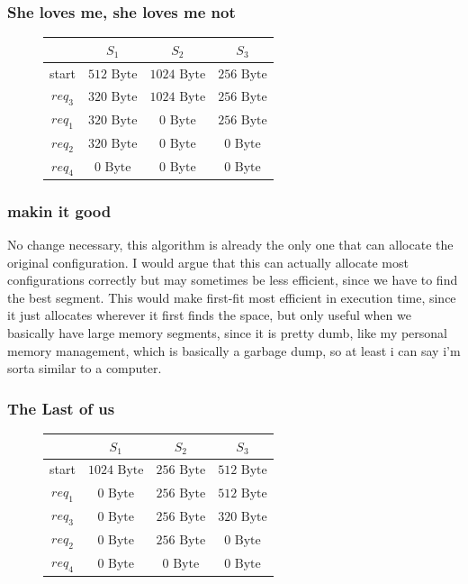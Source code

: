 \documentclass[a4paper, 11pt]{article}
\begin{document}
\subsubsection{She loves me, she loves me not}
\begin{figure}[h]
      \centering
      \begin{tabular}{|c|c|c|c|}
        \hline
        &$S_1$&$S_2$&$S_3$\\\hline
        start&$512 \mbox{ Byte}$&$1024 \mbox{ Byte}$&$256 \mbox{ Byte}$\\
        $req_3$&$320 \mbox{ Byte}$&$1024 \mbox{ Byte}$&$256 \mbox{ Byte}$\\
        $req_1$&$320 \mbox{ Byte}$&$0 \mbox{ Byte}$&$256 \mbox{ Byte}$\\
        $req_2$&$320 \mbox{ Byte}$&$0 \mbox{ Byte}$&$0 \mbox{ Byte}$\\
        $req_4$&$0 \mbox{ Byte}$&$0 \mbox{ Byte}$&$0 \mbox{ Byte}$\\\hline
  
      \end{tabular}
\end{figure}

\subsubsection{makin it good}
No change necessary, this algorithm is already the only one that can allocate the original configuration. 
I would argue that this can actually allocate most configurations correctly but may sometimes be less efficient, since we have to find 
the best segment. This would make first-fit most efficient in execution time, since it just allocates wherever it first finds the space, 
but only useful when we basically have large memory segments, since it is pretty dumb, like my personal memory management, which is basically a garbage dump,
so at least i can say i'm sorta similar to a computer.
\newpage

\subsubsection{The Last of us}
\begin{figure}[h]
  \centering
  \begin{tabular}{|c|c|c|c|}
    \hline
    &$S_1$&$S_2$&$S_3$\\\hline
    start&$1024 \mbox{ Byte}$&$256 \mbox{ Byte}$&$512 \mbox{ Byte}$\\
    $req_1$&$0 \mbox{ Byte}$&$256 \mbox{ Byte}$&$512 \mbox{ Byte}$\\
    $req_3$&$0 \mbox{ Byte}$&$256 \mbox{ Byte}$&$320 \mbox{ Byte}$\\
    $req_2$&$0 \mbox{ Byte}$&$256 \mbox{ Byte}$&$0 \mbox{ Byte}$\\
    $req_4$&$0 \mbox{ Byte}$&$0 \mbox{ Byte}$&$0 \mbox{ Byte}$\\\hline

  \end{tabular}
\end{figure}
\end{document}

